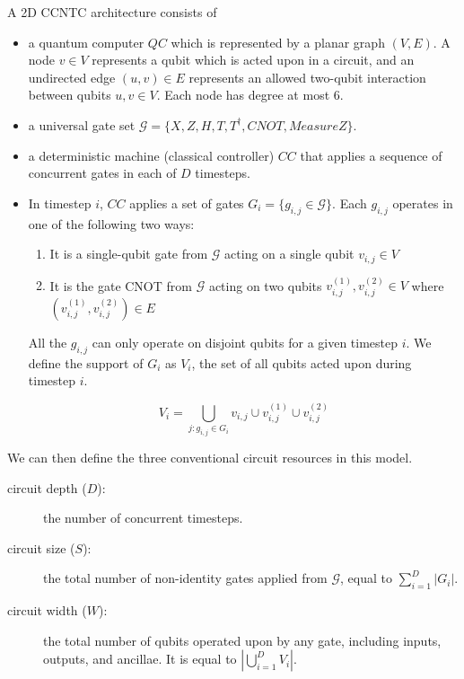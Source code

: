 \begin{definition}
A \textsf{2D CCNTC} architecture consists of

\begin{itemize}
\item a quantum computer $QC$ which is represented by a planar graph $(V,E)$. A
node $v \in V$ represents a qubit which is acted upon in a circuit, and an
undirected edge $(u,v) \in E$ represents 
an allowed two-qubit interaction between qubits $u,v \in V$. Each node has
degree at most $6$.
\item a universal gate set $\mathcal{G} = \{X, Z, H, T, T^{\dagger}, CNOT, MeasureZ\}$.

\item a deterministic machine (classical controller) $CC$ that applies a sequence
of concurrent gates in each of $D$ timesteps.
\item In timestep $i$, $CC$ applies a set of
gates $G_i = \{g_{i,j} \in \mathcal{G} \}$.
Each $g_{i,j}$ operates in one of the following two ways:
\begin{enumerate}
\item It is a single-qubit gate from $\mathcal{G}$ acting on a single qubit $v_{i,j} \in V$
\item
It is the gate CNOT from $\mathcal{G}$ acting on two qubits $v^{(1)}_{i,j}, v^{(2)}_{i,j} \in V$ where
$(v^{(1)}_{i,j}, v^{(2)}_{i,j}) \in E$
\end{enumerate}
All the $g_{i,j}$ can only operate on
disjoint qubits for a given timestep $i$. We define the support of $G_i$
as $V_i$, the set of all qubits acted upon during timestep $i$.

\begin{equation}
V_i = \bigcup_{j: g_{i,j} \in G_i} v_{i,j} \cup v^{(1)}_{i,j} \cup v^{(2)}_{i,j}
\end{equation}

\end{itemize}
\end{definition}

We can then define the three conventional circuit resources in this model.

\begin{description}
\item[circuit depth ($D$):] the number of concurrent timesteps.
\item[circuit size ($S$):] the total number of non-identity gates applied
from $\mathcal{G}$, equal to $\sum_{i=1}^D |G_i|$.
\item[circuit width ($W$):] the total number of qubits operated upon by
any gate, including inputs, outputs, and ancillae. It is equal to $| \bigcup_{i=1}^D V_i|$.
\end{description}

